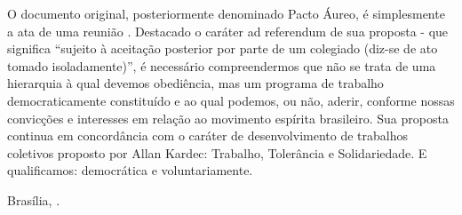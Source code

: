 O documento original, posteriormente denominado Pacto Áureo, é simplesmente a ata de uma reunião \cite{pactoaureo}. Destacado o caráter ad referendum de sua proposta - que significa ``sujeito à aceitação posterior por parte de um colegiado (diz-se de ato tomado isoladamente)'', é necessário compreendermos que não se trata de uma hierarquia à qual devemos obediência, mas um programa de trabalho democraticamente constituído e ao qual podemos, ou não, aderir, conforme nossas convicções e interesses em relação ao movimento espírita brasileiro. Sua proposta continua em concordância com o caráter de desenvolvimento de trabalhos coletivos proposto por Allan Kardec: Trabalho, Tolerância e Solidariedade. E qualificamos: democrática e voluntariamente.  

\vspace{1,2cm}
\hspace{\fill} Brasília, \imprimirdata.